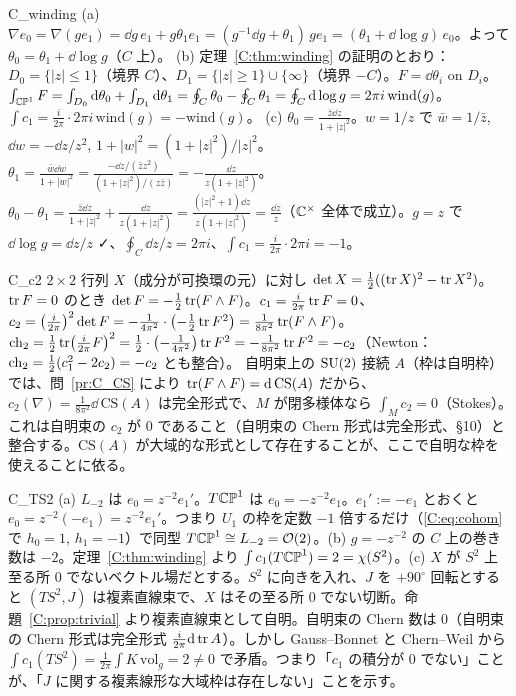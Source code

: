 \begin{soll}{C_winding}
(a) $\nabla e_0=\nabla(ge_1)=\dd g\,e_1+g\theta_1e_1=(g^{-1}\dd g+\theta_1)\,ge_1=(\theta_1+\dd\log g)\,e_0$。よって $\theta_0=\theta_1+\dd\log g$（$C$ 上）。
(b) 定理~\ref{C:thm:winding} の証明のとおり：$D_0=\{|z|\le1\}$（境界 $C$）、$D_1=\{|z|\ge1\}\cup\{\infty\}$（境界 $-C$）。$F=\dd\theta_i$ on $D_i$。$\int_{\mathbb{CP}^1}F=\int_{D_0}\mathrm{d}\theta_0+\int_{D_1}\mathrm{d}\theta_1=\oint_C\theta_0-\oint_C\theta_1=\oint_C\mathrm{d}\log g=2\pi i\,\mathrm{wind}(g)$。$\int c_1=\frac i{2\pi}\cdot2\pi i\,\mathrm{wind}(g)=-\mathrm{wind}(g)$。
(c) $\theta_0=\frac{\bar z\dd z}{1+|z|^2}$。$w=1/z$ で $\bar w=1/\bar z$, $\dd w=-\dd z/z^2$, $1+|w|^2=(1+|z|^2)/|z|^2$。$\theta_1=\frac{\bar w\dd w}{1+|w|^2}=\frac{-\dd z/(\bar zz^2)}{(1+|z|^2)/(z\bar z)}=-\frac{\dd z}{z(1+|z|^2)}$。$\theta_0-\theta_1=\frac{\bar z\dd z}{1+|z|^2}+\frac{\dd z}{z(1+|z|^2)}=\frac{(|z|^2+1)\dd z}{z(1+|z|^2)}=\frac{\dd z}z$（$\mathbb C^\times$ 全体で成立）。$g=z$ で $\dd\log g=\dd z/z$ ✓、$\oint_C\dd z/z=2\pi i$、$\int c_1=\frac i{2\pi}\cdot2\pi i=-1$。
\end{soll}

\begin{soll}{C_c2}
$2\times2$ 行列 $X$（成分が可換環の元）に対し $\det X=\frac12((\operatorname{tr} X)^2-\operatorname{tr} X^2)$。$\operatorname{tr} F=0$ のとき $\det F=-\frac12\operatorname{tr}(F\wedge F)$。$c_1=\frac i{2\pi}\operatorname{tr} F=0$、$c_2=\bigl(\frac i{2\pi}\bigr)^2\det F=-\frac1{4\pi^2}\cdot\bigl(-\frac12\operatorname{tr} F^2\bigr)=\frac1{8\pi^2}\operatorname{tr}(F\wedge F)$。$\mathrm{ch}_2=\frac12\operatorname{tr}\bigl(\frac i{2\pi}F\bigr)^2=\frac12\cdot\bigl(-\frac1{4\pi^2}\bigr)\operatorname{tr} F^2=-\frac1{8\pi^2}\operatorname{tr} F^2=-c_2$（Newton：$\mathrm{ch}_2=\frac12(c_1^2-2c_2)=-c_2$ とも整合）。
自明束上の $\mathrm{SU}(2)$ 接続 $A$（枠は自明枠）では、問~\ref{pr:C_CS} により $\operatorname{tr}(F\wedge F)=\mathrm{d}\,\mathrm{CS}(A)$ だから、$c_2(\nabla)=\frac1{8\pi^2}\dd\,\mathrm{CS}(A)$ は完全形式で、$M$ が閉多様体なら $\int_Mc_2=0$（Stokes）。これは自明束の $c_2$ が $0$ であること（自明束の Chern 形式は完全形式、§10）と整合する。$\mathrm{CS}(A)$ が大域的な形式として存在することが、ここで自明な枠を使えることに依る。
\end{soll}


\begin{soll}{C_TS2}
(a) $L_{-2}$ は $e_0=z^{-2}e_1'$。$T\mathbb{CP}^1$ は $e_0=-z^{-2}e_1$。$e_1':=-e_1$ とおくと $e_0=z^{-2}(-e_1)=z^{-2}e_1'$。つまり $U_1$ の枠を定数 $-1$ 倍するだけ（\eqref{C:eq:cohom} で $h_0=1$, $h_1=-1$）で同型 $T\mathbb{CP}^1\cong L_{-2}=\mathcal O(2)$。(b) $g=-z^{-2}$ の $C$ 上の巻き数は $-2$。定理~\ref{C:thm:winding} より $\int c_1(T\mathbb{CP}^1)=2=\chi(S^2)$。(c) $X$ が $S^2$ 上至る所 $0$ でないベクトル場だとする。$S^2$ に向きを入れ、$J$ を $+90^\circ$ 回転とすると $(TS^2,J)$ は複素直線束で、$X$ はその至る所 $0$ でない切断。命題~\ref{C:prop:trivial} より複素直線束として自明。自明束の Chern 数は $0$（自明束の Chern 形式は完全形式 $\frac i{2\pi}\mathrm{d}\operatorname{tr} A$）。しかし Gauss--Bonnet と Chern--Weil から $\int c_1(TS^2)=\frac1{2\pi}\int K\,\mathrm{vol}_g=2\ne0$ で矛盾。つまり「$c_1$ の積分が $0$ でない」ことが、「$J$ に関する複素線形な大域枠は存在しない」ことを示す。
\end{soll}

